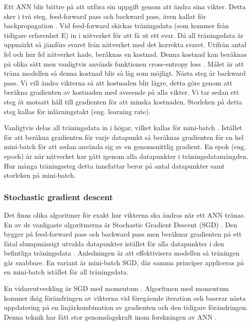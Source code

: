 \documentclass[]{kththesis}
\begin{document}
Ett ANN blir bättre på att utföra sin uppgift genom att ändra sina vikter. Detta sker i två steg, feed-forward pass och backward pass, även kallat för backpropagation \parencite{alpaydin2009introduction}. Vid feed-forward skickas träningsdata (som kommer från tidigare erfarenhet E) in i nätverket för att få ut ett svar. Då all träningsdata är uppmärkt så jämförs svaret från nätverket med det korrekta svaret. Utifrån antal fel och hur fel nätverket hade, beräknas en kostnad. Denna kostnad kan beräknas på olika sätt men vanligtvis används funktionen cross-entropy loss \parencite{Goodfellow-et-al-2016}. Målet är att träna modellen så denna kostnad blir så låg som möjligt. Nästa steg är backward pass. Vi vill ändra vikterna så att kostnaden blir lägre, detta görs genom att beräkna gradienten av kostnaden med avseende på alla vikter. Vi tar sedan ett steg åt motsatt håll till gradienten för att minska kostnaden. Storleken på detta steg kallas för inlärningstakt (eng. learning rate).

Vanligtvis delas all träningsdata in i högar, vilket kallas för mini-batch \parencite{Goodfellow-et-al-2016}. Istället för att beräkna gradienten för varje datapunkt så beräknas gradienten för en hel mini-batch för att sedan använda sig av en genomsnittlig gradient. En epok (eng. epoch) är när nätverket har gått igenom alla datapunkter i träningsdatamängden. Hur många träningssteg detta innefattar beror på antal datapunkter samt storleken på mini-batch.

\subsubsection{Stochastic gradient descent}
Det finns olika algoritmer för exakt hur vikterna ska ändras när ett ANN tränas. En av de vanligaste algoritmerna är Stochastic Gradient Descent (SGD) \parencite{Goodfellow-et-al-2016}. Den bygger på feed-forward pass och backward pass men beräknar gradienten på ett fåtal slumpmässigt utvalda datapunkter istället för alla datapunkter i den befintliga träningsdata \parencite{bottou2010large}. Anledningen är att effektivisera modellen så träningen går snabbare. En variant är mini-batch SGD, där samma principer appliceras på en mini-batch istället för all träningsdata.

En vidareutveckling är SGD med momentum \parencite{qian1999momentum}. Algoritmen med momentum kommer ihåg förändringen av vikterna vid föregående iteration och baserar nästa uppdatering på en linjärkombination av gradienten och den tidigare förändringen. Denna teknik har fått stor genomslagskraft inom forskningen av ANN \parencite{sutskever2013importance}.
\end{document}
